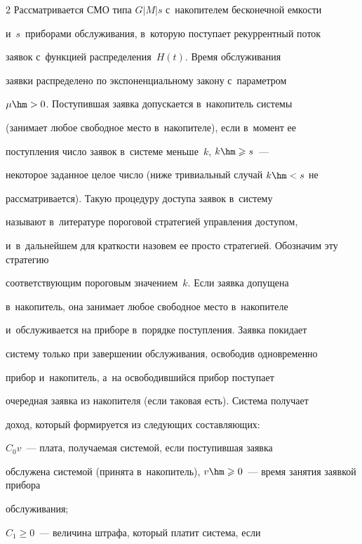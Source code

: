 \begin{multicols}{2}
Рассматривается СМО типа $G|M|s$ с~накопителем бесконечной емкости


и~$s$~приборами обслуживания, в~которую поступает рекуррентный поток


заявок с~функцией  распределения~$H(t)$. Время обслуживания


заявки распределено по экспоненциальному закону с~параметром


$\mu\hm>0$. Поступившая заявка допускается в~накопитель системы


(занимает любое свободное место в~накопителе), если в~момент ее


поступления число заявок в~системе меньше~$k$, $k\hm\geqslant s$~---


некоторое заданное целое число (ниже тривиальный случай $k\hm<s$ не


рассматривается). Такую процедуру доступа заявок в~систему


называют в~литературе пороговой стратегией управ\-ле\-ния доступом, 


и~в~дальнейшем для краткости назовем ее просто стратегией. Обозначим эту стратегию


соответствующим пороговым значением~$k$. Если заявка допущена 


в~накопитель, она занимает любое свободное место в~накопителе 


и~обслуживается на приборе в~порядке поступления. Заявка покидает


систему только при завершении обслуживания, освободив одновременно


прибор и~накопитель, а~на освободившийся прибор поступает


очередная заявка из накопителя (если таковая есть). Система получает


доход, который формируется из следующих составляющих:


\begin{description}


\item $C_0v$~--- плата, получаемая системой, если поступившая заявка


обслужена  системой (принята в~накопитель), $v\hm\geqslant 0$~--- время занятия заявкой прибора


 обслуживания;\\[-14.5pt]


\item


$C_1\geqslant 0$~--- величина штрафа, который платит сис\-те\-ма, если



\end{description}
\end{multicols}

